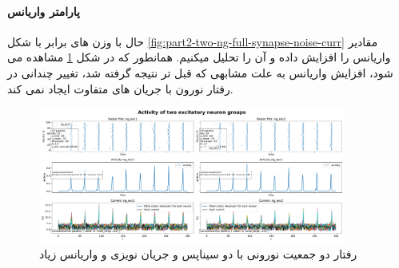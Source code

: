         \paragraph*{پارامتر واریانس}
            حال با وزن های برابر با شکل 
            \ref{fig:part2-two-ng-full-synapse-noise-curr}
            مقادیر واریانس را افزایش داده و آن را تحلیل میکنیم.
            همانطور که در شکل 
            \ref{fig:part2-two-ng-full-synapse-high-variance-noise-curr}
            مشاهده می شود، افزایش واریانس به علت مشابهی که قبل تر نتیجه گرفته شد، تغییر چندانی در رفتار نورون با جریان های متفاوت ایجاد نمی کند.
            \begin{figure}[!ht]
                \centering
                \includegraphics[width=0.9\textwidth]{plots/part2-two-ng-full-synapse-diff-variance-noise-curr.pdf} 
                \caption{رفتار دو جمعیت نورونی با دو سیناپس و جریان نویزی و واریانس زیاد}
                \label{fig:part2-two-ng-full-synapse-high-variance-noise-curr}
            \end{figure}

